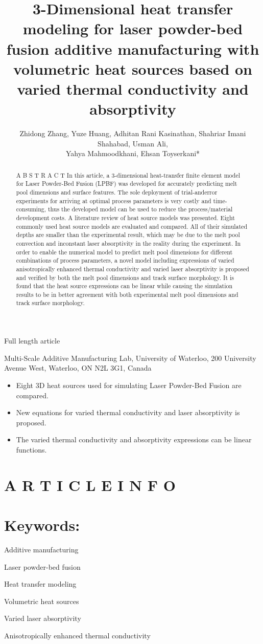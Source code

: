 \documentclass[10pt]{article}
\title{3-Dimensional heat transfer modeling for laser powder-bed fusion additive manufacturing with volumetric heat sources based on varied thermal conductivity and absorptivity }
\author{Zhidong Zhang, Yuze Huang, Adhitan Rani Kasinathan, Shahriar Imani Shahabad, Usman Ali,\\
Yahya Mahmoodkhani, Ehsan Toyserkani*}
\date{}
\begin{document}
\maketitle
Full length article

Multi-Scale Additive Manufacturing Lab, University of Waterloo, 200 University Avenue West, Waterloo, ON N2L 3G1, Canada

\begin{itemize}
  \item Eight 3D heat sources used for simulating Laser Powder-Bed Fusion are compared.
  \item New equations for varied thermal conductivity and laser absorptivity is proposed.
  \item The varied thermal conductivity and absorptivity expressions can be linear functions.
\end{itemize}

\section*{A R T I C L E I N F O}
\section*{Keywords:}
Additive manufacturing

Laser powder-bed fusion

Heat transfer modeling

Volumetric heat sources

Varied laser absorptivity

Anisotropically enhanced thermal conductivity

\begin{abstract}
A B S T R A C T In this article, a 3-dimensional heat-transfer finite element model for Laser Powder-Bed Fusion (LPBF) was developed for accurately predicting melt pool dimensions and surface features. The sole deployment of trial-anderror experiments for arriving at optimal process parameters is very costly and time-consuming, thus the developed model can be used to reduce the process/material development costs. A literature review of heat source models was presented. Eight commonly used heat source models are evaluated and compared. All of their simulated depths are smaller than the experimental result, which may be due to the melt pool convection and inconstant laser absorptivity in the reality during the experiment. In order to enable the numerical model to predict melt pool dimensions for different combinations of process parameters, a novel model including expressions of varied anisotropically enhanced thermal conductivity and varied laser absorptivity is proposed and verified by both the melt pool dimensions and track surface morphology. It is found that the heat source expressions can be linear while causing the simulation results to be in better agreement with both experimental melt pool dimensions and track surface morphology.
\end{abstract}
\end{document}

